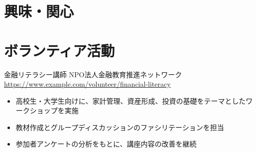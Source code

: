 \documentclass[a4paper, serif, 10pt]{moderncv}
\begin{document}
\section{興味・関心}

\section{ボランティア活動}

        {金融リテラシー講師}
        {NPO法人金融教育推進ネットワーク}
        {\url{https://www.example.com/volunteer/financial-literacy}}
        {}
        {\begin{itemize}
\item 高校生・大学生向けに、家計管理、資産形成、投資の基礎をテーマとしたワークショップを実施
\item 教材作成とグループディスカッションのファシリテーションを担当
\item 参加者アンケートの分析をもとに、講座内容の改善を継続
\end{itemize}}
    
\end{document}
